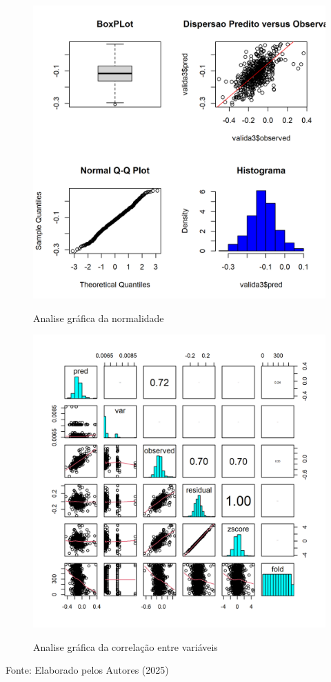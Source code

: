 			\begin{minipage}[t!]{0.5\textwidth}
					\begin{figure}[H]
				    \centering  \small \caption{Analise gráfica da  normalidade}
					\includegraphics[width=0.7\linewidth]{FIGURAS/valicas}
					\label{fig:valicas}
				\end{figure}
				
			\end{minipage}\hfill
			\begin{minipage}[t!]{0.5\textwidth}
					\begin{figure}[H]
					\centering  \small \caption{Analise gráfica da  correlação entre variáveis}
					\includegraphics[width=0.7\linewidth]{FIGURAS/painel-correla}
					\label{fig:painel-correla}
				\end{figure}
				
			\end{minipage} 
			 			\begin{center}
				Fonte:   Elaborado pelos Autores (2025)
			\end{center}
 
